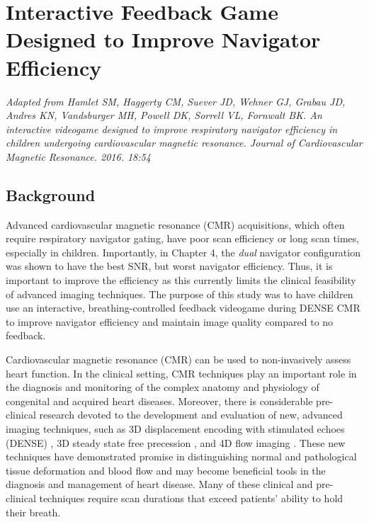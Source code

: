 \chapter{Interactive Feedback Game Designed to Improve Navigator Efficiency}

\begin{center}
	\textit{Adapted from Hamlet SM, Haggerty CM, Suever JD, Wehner GJ, Grabau JD, Andres KN, Vandsburger MH, Powell DK, Sorrell VL, Fornwalt BK. An interactive videogame designed to improve respiratory navigator efficiency in children undergoing cardiovascular magnetic resonance. Journal of Cardiovascular Magnetic Resonance. 2016. 18:54} \cite{Hamlet2016a}
\end{center}
	
\section{Background}
	Advanced cardiovascular magnetic resonance (CMR) acquisitions, which often require respiratory navigator gating, have poor scan efficiency or long scan times, especially in children. Importantly, in Chapter 4, the \textit{dual} navigator configuration was shown to have the best SNR, but worst navigator efficiency. Thus, it is important to improve the efficiency as this currently limits the clinical feasibility of advanced imaging techniques. The purpose of this study was to have children use an interactive, breathing-controlled feedback videogame during DENSE CMR to improve navigator efficiency and maintain image quality compared to no feedback.

	Cardiovascular magnetic resonance (CMR) can be used to non-invasively assess heart function. In the clinical setting, CMR techniques play an important role in the diagnosis and monitoring of the complex anatomy and physiology of congenital and acquired heart diseases. Moreover, there is considerable pre-clinical research devoted to the development and evaluation of new, advanced imaging techniques, such as 3D displacement encoding with stimulated echoes (DENSE) \cite{Zhong2010a}, 3D steady state free precession \cite{Potthast2010}, and 4D flow imaging \cite{Markl2011}. These new techniques have demonstrated promise in distinguishing normal and pathological tissue deformation and blood flow and may become beneficial tools in the diagnosis and management of heart disease. Many of these clinical and pre-clinical techniques require scan durations that exceed patients' ability to hold their breath.
	
